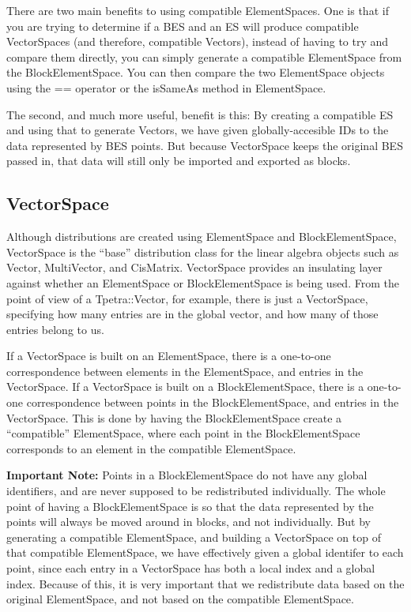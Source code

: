 \documentclass[10pt,relax]{TpetraDesign}
\begin{document}
There are two main benefits to using compatible ElementSpaces. One is that if you are trying to determine if a BES and an ES will produce compatible VectorSpaces (and therefore, compatible Vectors), instead of having to try and compare them directly, you can simply generate a compatible ElementSpace from the BlockElementSpace. You can then compare the two ElementSpace objects using the == operator or the isSameAs method in ElementSpace.

The second, and much more useful, benefit is this: By creating a compatible ES and using that to generate Vectors, we have given globally-accesible IDs to the data represented by BES points. But because VectorSpace keeps the original BES passed in, that data will still only be imported and exported as blocks.

%
\subsection{VectorSpace}
Although distributions are created using ElementSpace and BlockElementSpace, VectorSpace is the ``base'' distribution class for the linear algebra objects such as Vector, MultiVector, and CisMatrix. VectorSpace provides an insulating layer against whether an ElementSpace or BlockElementSpace is being used. From the point of view of a Tpetra::Vector, for example, there is just a VectorSpace, specifying how many entries are in the global vector, and how many of those entries belong to us.

If a VectorSpace is built on an ElementSpace, there is a one-to-one correspondence between elements in the ElementSpace, and entries in the VectorSpace. If a VectorSpace is built on a BlockElementSpace, there is a one-to-one correspondence between points in the BlockElementSpace, and entries in the VectorSpace. This is done by having the BlockElementSpace create a ``compatible'' ElementSpace, where each point in the BlockElementSpace corresponds to an element in the compatible ElementSpace.

\textbf{Important Note:} Points in a BlockElementSpace do not have any global identifiers, and are never supposed to be redistributed individually. The whole point of having a BlockElementSpace is so that the data represented by the points will always be moved around in blocks, and not individually. But by generating a compatible ElementSpace, and building a VectorSpace on top of that compatible ElementSpace, we have effectively given a global identifer to each point, since each entry in a VectorSpace has both a local index and a global index. Because of this, it is very important that we redistribute data based on the original ElementSpace, and not based on the compatible ElementSpace. 
\end{document}

